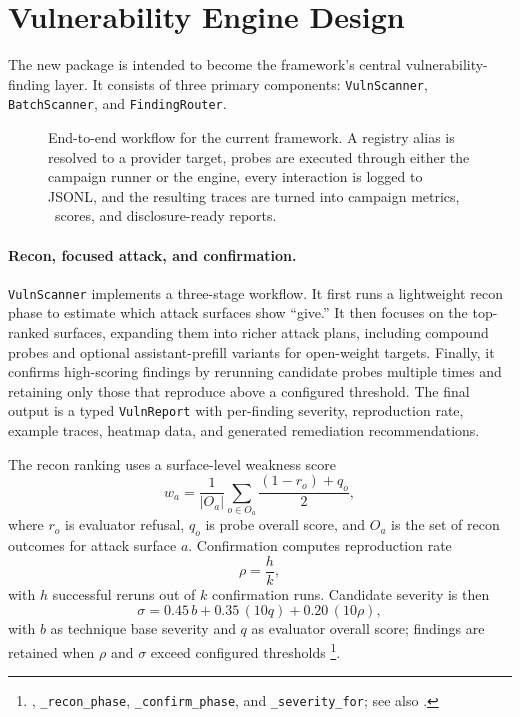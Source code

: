 \section{Vulnerability Engine Design}
\label{sec:engine}

The new  package is intended to become the framework's central
vulnerability-finding layer. It consists of three primary components:
\texttt{VulnScanner}, \texttt{BatchScanner}, and \texttt{FindingRouter}.

\begin{figure}[t]
  \centering
  \resizebox{0.95\textwidth}{!}{}
  \caption{End-to-end workflow for the current framework. A registry alias is
  resolved to a provider target, probes are executed through either the
  campaign runner or the engine, every interaction is logged to JSONL, and the
  resulting traces are turned into campaign metrics, \sr\ scores, and
  disclosure-ready reports.}
  \label{fig:workflow}
\end{figure}

\paragraph{Recon, focused attack, and confirmation.}
\texttt{VulnScanner} implements a three-stage workflow. It first runs a
lightweight recon phase to estimate which attack surfaces show ``give.'' It
then focuses on the top-ranked surfaces, expanding them into richer attack
plans, including compound probes and optional assistant-prefill variants for
open-weight targets. Finally, it confirms high-scoring findings by rerunning
candidate probes multiple times and retaining only those that reproduce above a
configured threshold. The final output is a typed \texttt{VulnReport} with
per-finding severity, reproduction rate, example traces, heatmap data, and
generated remediation recommendations.

The recon ranking uses a surface-level weakness score
\[
w_a = \frac{1}{|O_a|}\sum_{o \in O_a}\frac{(1-r_o)+q_o}{2},
\]
where $r_o$ is evaluator refusal, $q_o$ is probe overall score, and $O_a$ is
the set of recon outcomes for attack surface $a$. Confirmation computes
reproduction rate
\[
\rho = \frac{h}{k},
\]
with $h$ successful reruns out of $k$ confirmation runs. Candidate severity is
then
\[
\sigma = 0.45\,b + 0.35\,(10q) + 0.20\,(10\rho),
\]
with $b$ as technique base severity and $q$ as evaluator overall score; findings
are retained when $\rho$ and $\sigma$ exceed configured thresholds
\footnote{, \texttt{\_recon\_phase}, \texttt{\_confirm\_phase}, and
\texttt{\_severity\_for}; see also .}.

